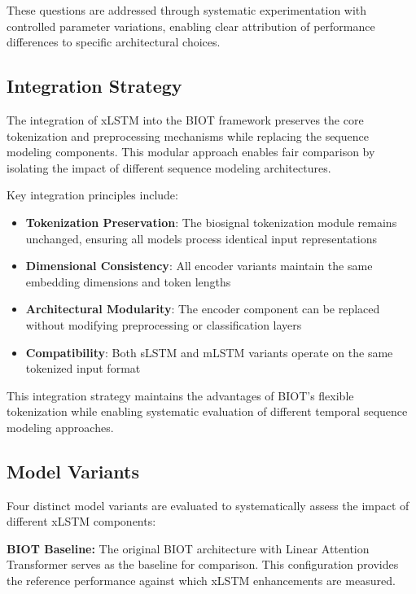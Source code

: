 These questions are addressed through systematic experimentation with controlled parameter variations, enabling clear attribution of performance differences to specific architectural choices.

\subsection{Integration Strategy}
\label{sec:integration_strategy}

The integration of \ac{xLSTM} into the \ac{BIOT} framework preserves the core tokenization and preprocessing mechanisms while replacing the sequence modeling components. This modular approach enables fair comparison by isolating the impact of different sequence modeling architectures.

Key integration principles include:
\begin{itemize}
    \item \textbf{Tokenization Preservation}: The biosignal tokenization module remains unchanged, ensuring all models process identical input representations
    \item \textbf{Dimensional Consistency}: All encoder variants maintain the same embedding dimensions and token lengths
    \item \textbf{Architectural Modularity}: The encoder component can be replaced without modifying preprocessing or classification layers
    \item \textbf{Compatibility}: Both \ac{sLSTM} and \ac{mLSTM} variants operate on the same tokenized input format
\end{itemize}

This integration strategy maintains the advantages of \ac{BIOT}'s flexible tokenization while enabling systematic evaluation of different temporal sequence modeling approaches.

\subsection{Model Variants}
\label{sec:model_variants}

Four distinct model variants are evaluated to systematically assess the impact of different \ac{xLSTM} components:

\textbf{BIOT Baseline:} The original \ac{BIOT} architecture with Linear Attention Transformer serves as the baseline for comparison. This configuration provides the reference performance against which \ac{xLSTM} enhancements are measured.

